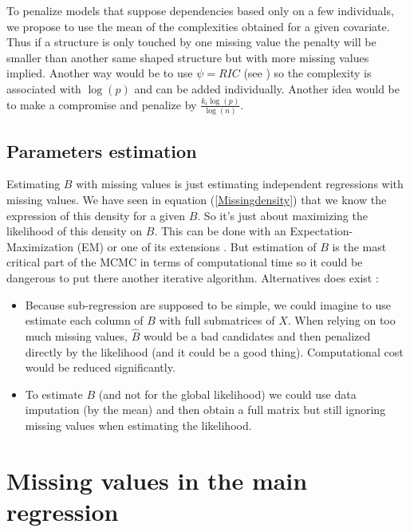 \documentclass[11pt,a4paper]{report}
\begin{document}
			To penalize models that suppose dependencies based only on a few individuals, we propose to use the mean of the complexities obtained for a given covariate. Thus if a structure is only touched by one missing value the penalty will be smaller than another same shaped structure but with more missing values implied.
			Another way would be to use $\psi=RIC$ (see \cite{foster1994risk}) so the complexity is associated with $\log(p)$ and can be added individually. Another idea would be to make a compromise and penalize by $\frac{k_i\log(p)}{\log(n)}$.
		
%	
		
		\subsection{Parameters estimation}
			Estimating $B$ with missing values is just estimating independent regressions with missing values. We have seen in equation (\ref{Missingdensity}) that we know the expression of this density for a given $B$. So it's just about maximizing the likelihood of this density on $B$. This can be done with an Expectation-Maximization (EM) \cite{dempster1977maximum} or one of its extensions \cite{mclachlan2007algorithm}.
			But estimation of $B$ is the mast critical part of the MCMC in terms of computational time so it could be dangerous to put there another iterative algorithm. 
			Alternatives does exist :
			\begin{itemize}
				\item Because sub-regression are supposed to be simple, we could imagine to use estimate each column of $B$ with full submatrices of $X$. When relying on too much missing values, $\hat{B}$ would be a bad candidates and then penalized directly by the likelihood (and it could be a good thing). Computational cost would be reduced significantly.
				\item To estimate $B$ (and not for the global likelihood) we could use data imputation (by the mean) and then obtain a full matrix but still ignoring missing values when estimating the likelihood.
			\end{itemize}
	\section{Missing values in the main regression}
\end{document}
